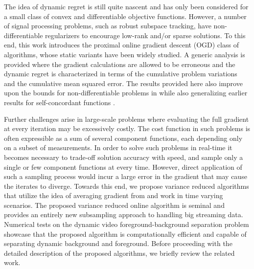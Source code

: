 \documentclass[draftcls,onecolumn,12pt]{IEEEtran}
\theoremstyle{plain}
\theoremstyle{plain}
\theoremstyle{remark}
\begin{document}
	The idea of dynamic regret is still quite nascent and has only been considered for a small class of convex and differentiable objective functions. However, a number of signal processing problems, such as robust subspace tracking, have non-differentiable regularizers to encourage low-rank and/or sparse solutions. To this end, this work introduces the proximal online gradient descent (OGD) class of algorithms, whose static variants have been widely studied. A generic analysis is provided where the gradient calculations are allowed to be erroneous and the dynamic regret is characterized in terms of the cumulative problem variations and the cumulative mean squared error. The results provided here also improve upon the bounds for non-differentiable problems in  \cite{hall2015online} while also generalizing earlier results for self-concordant functions \cite{zhang2016improved}.
	
	Further challenges arise in large-scale problems where evaluating the full gradient at every iteration may be excessively costly. The cost function in such problems is often expressible as a sum of several component functions, each depending only on a subset of measurements. In order to solve such problems in real-time it becomes necessary to trade-off solution accuracy with speed, and sample only a single or few component functions at every time. However, direct application of such a sampling process would incur a large error in the gradient that may cause the iterates to diverge. Towards this end, we propose variance reduced algorithms that utilize the idea of averaging gradient from \cite{defazio2014saga} and work in time varying scenarios. The proposed variance reduced online algorithm is seminal and provides an entirely new subsampling approach to handling big streaming data. Numerical tests on the dynamic video foreground-background separation problem showcase that the proposed algorithm is computationally efficient and capable of separating dynamic background and foreground. Before proceeding with the detailed description of the proposed algorithms, we briefly review the related work. 
	

	
	
\end{document}
